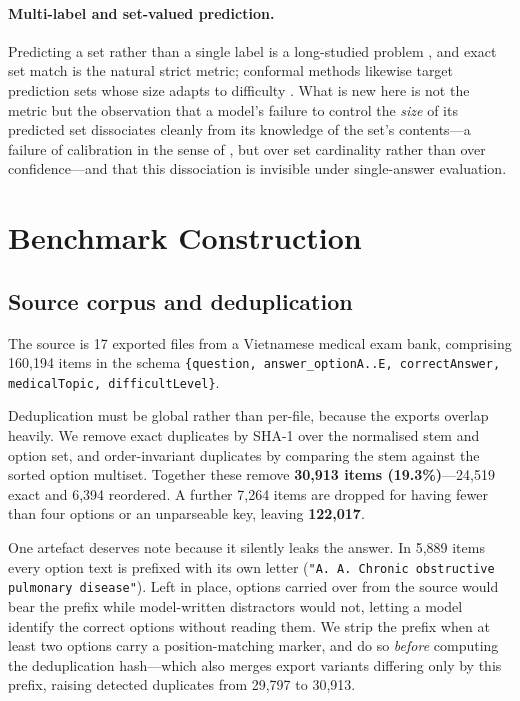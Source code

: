 \documentclass{article} %
\begin{document}
\paragraph{Multi-label and set-valued prediction.} Predicting a set rather than a single
label is a long-studied problem \citep{tsoumakas2007multilabel}, and exact set match is
the natural strict metric; conformal methods likewise target prediction sets whose size
adapts to difficulty \citep{romano2020classification}. What is new here is not the metric
but the observation that a model's failure to control the \emph{size} of its predicted
set dissociates cleanly from its knowledge of the set's contents---a failure of
calibration in the sense of \citet{guo2017calibration}, but over set cardinality rather
than over confidence---and that this dissociation is invisible under single-answer
evaluation.

\section{Benchmark Construction}
\label{sec:construction}

\subsection{Source corpus and deduplication}

The source is 17 exported files from a Vietnamese medical exam bank, comprising 160,194
items in the schema \texttt{\{question, answer\_optionA..E, correctAnswer, medicalTopic,
difficultLevel\}}.

Deduplication must be global rather than per-file, because the exports overlap heavily.
We remove exact duplicates by SHA-1 over the normalised stem and option set, and
order-invariant duplicates by comparing the stem against the sorted option multiset.
Together these remove \textbf{30,913 items (19.3\%)}---24,519 exact and 6,394 reordered.
A further 7,264 items are dropped for having fewer than four options or an unparseable
key, leaving \textbf{122,017}.

One artefact deserves note because it silently leaks the answer. In 5,889 items every
option text is prefixed with its own letter (\texttt{"A. A. Chronic obstructive pulmonary
disease"}). Left in place, options carried over from the source would bear the prefix
while model-written distractors would not, letting a model identify the correct options
without reading them. We strip the prefix when at least two options carry a
position-matching marker, and do so \emph{before} computing the deduplication hash---which
also merges export variants differing only by this prefix, raising detected duplicates
from 29,797 to 30,913.
\end{document}
